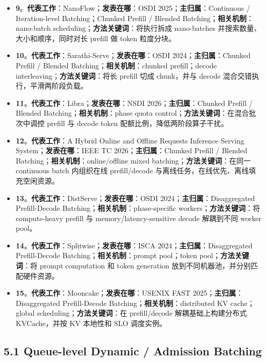 \documentclass[a4paper,twocolumn,10pt]{ctexart}
\begin{document}
\begin{itemize}
\item \textbf{9}。\textbf{代表工作}：NanoFlow；\textbf{发表在哪}：OSDI 2025；\textbf{主归属}：Continuous / Iteration-level Batching；Chunked Prefill / Blended Batching；\textbf{相关机制}：nano-batch scheduling；\textbf{方法关键词}：将执行拆成 nano-batches 并搜索数量、大小和顺序，同时对长 prefill 做 token 粒度分块。
\item \textbf{10}。\textbf{代表工作}：Sarathi-Serve；\textbf{发表在哪}：OSDI 2024；\textbf{主归属}：Chunked Prefill / Blended Batching；\textbf{相关机制}：chunked prefill；decode interleaving；\textbf{方法关键词}：将长 prefill 切成 chunk，并与 decode 混合交错执行，平滑两阶段负载。
\item \textbf{11}。\textbf{代表工作}：Libra；\textbf{发表在哪}：NSDI 2026；\textbf{主归属}：Chunked Prefill / Blended Batching；\textbf{相关机制}：phase quota control；\textbf{方法关键词}：在混合批次中调控 prefill 与 decode token 配额比例，降低两阶段算子干扰。
\item \textbf{12}。\textbf{代表工作}：A Hybrid Online and Offline Requests Inference Serving System；\textbf{发表在哪}：IEEE TC 2026；\textbf{主归属}：Chunked Prefill / Blended Batching；\textbf{相关机制}：online/offline mixed batching；\textbf{方法关键词}：在同一 continuous batch 内组织在线 prefill/decode 与离线任务，在线优先、离线填充空闲资源。
\item \textbf{13}。\textbf{代表工作}：DistServe；\textbf{发表在哪}：OSDI 2024；\textbf{主归属}：Disaggregated Prefill-Decode Batching；\textbf{相关机制}：phase-specific workers；\textbf{方法关键词}：将 compute-heavy prefill 与 memory/latency-sensitive decode 解耦到不同 worker pool。
\item \textbf{14}。\textbf{代表工作}：Splitwise；\textbf{发表在哪}：ISCA 2024；\textbf{主归属}：Disaggregated Prefill-Decode Batching；\textbf{相关机制}：prompt pool；token pool；\textbf{方法关键词}：将 prompt computation 和 token generation 放到不同机器池，并分别匹配硬件资源。
\item \textbf{15}。\textbf{代表工作}：Mooncake；\textbf{发表在哪}：USENIX FAST 2025；\textbf{主归属}：Disaggregated Prefill-Decode Batching；\textbf{相关机制}：distributed KV cache；global scheduling；\textbf{方法关键词}：在 prefill/decode 解耦基础上构建分布式 KVCache，并按 KV 本地性和 SLO 调度实例。
\end{itemize}





\subsection{5.1 Queue-level Dynamic / Admission Batching}
\end{document}
